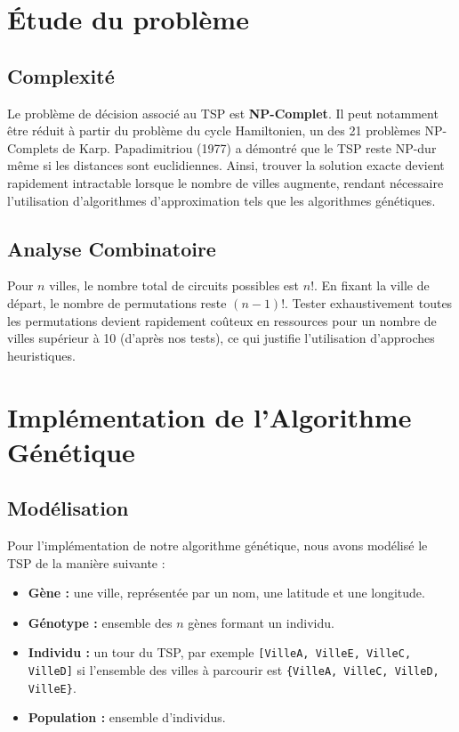 \documentclass[a4paper,12pt]{article}
\begin{document}
\section{Étude du problème}
\subsection{Complexité}
Le problème de décision associé au TSP est \textbf{NP-Complet}. Il peut notamment être réduit à partir du problème du cycle Hamiltonien, un des 21 problèmes NP-Complets de Karp. Papadimitriou (1977) a démontré que le TSP reste NP-dur même si les distances sont euclidiennes.  
Ainsi, trouver la solution exacte devient rapidement intractable lorsque le nombre de villes augmente, rendant nécessaire l'utilisation d'algorithmes d'approximation tels que les algorithmes génétiques.

\subsection{Analyse Combinatoire}
Pour $n$ villes, le nombre total de circuits possibles est $n!$.  
En fixant la ville de départ, le nombre de permutations reste $(n-1)!$.  
Tester exhaustivement toutes les permutations devient rapidement coûteux en ressources pour un nombre de villes supérieur à 10 (d'après nos tests), ce qui justifie l'utilisation d'approches heuristiques.

\section{Implémentation de l'Algorithme Génétique}

\subsection{Modélisation}
Pour l'implémentation de notre algorithme génétique, nous avons modélisé le TSP de la manière suivante :
\begin{itemize}
    \item \textbf{Gène :} une ville, représentée par un nom, une latitude et une longitude.
    \item \textbf{Génotype :} ensemble des $n$ gènes formant un individu.
    \item \textbf{Individu :} un tour du TSP, par exemple \verb|[VilleA, VilleE, VilleC, VilleD]| si l'ensemble des villes à parcourir est \verb|{VilleA, VilleC, VilleD, VilleE}|.
    \item \textbf{Population :} ensemble d'individus.
\end{itemize}
\end{document}
